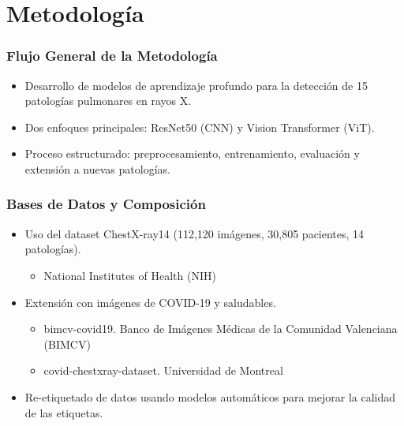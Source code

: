 
\section{Metodología}

\begin{frame}
\frametitle{Flujo General de la Metodología}
\begin{itemize}
    \item Desarrollo de modelos de aprendizaje profundo para la detección de 15 patologías pulmonares en rayos X.
    \item Dos enfoques principales: ResNet50 (CNN) y Vision Transformer (ViT).
    \item Proceso estructurado: preprocesamiento, entrenamiento, evaluación y extensión a nuevas patologías.
\end{itemize}
\end{frame}

\begin{frame}
\frametitle{Bases de Datos y Composición}
\begin{itemize}
    \item Uso del dataset ChestX-ray14 (112,120 imágenes, 30,805 pacientes, 14 patologías).
    \begin{itemize}
        \item National Institutes of Health (NIH)
    \end{itemize}
    \item Extensión con imágenes de COVID-19 y saludables.
    \begin{itemize}
        \item bimcv-covid19. Banco de Imágenes Médicas de la Comunidad Valenciana (BIMCV)
        \item covid-chestxray-dataset. Universidad de Montreal
    \end{itemize}
    \item Re-etiquetado de datos usando modelos automáticos para mejorar la calidad de las etiquetas.
\end{itemize}
\end{frame}

